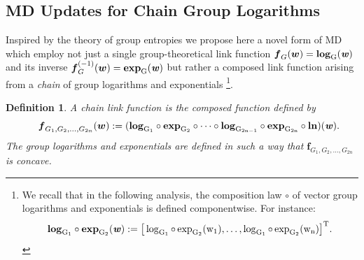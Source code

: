 \documentclass[10pt]{amsart}
\newcommand{\beq}{\begin{equation}}
\newcommand{\eeq}{\end{equation}}
\newcommand{\bi}[1]{\textbf{\textit{#1}}}
\newcommand{\bln}{\rm{\bf{ln}}}
\newcommand{\bexp}{\rm{\bf{exp}}}
\newcommand{\blog}{\rm{\bf{log}}}
\newcommand{\bof}{\boldsymbol{f}}
\newcommand{\bw}{\boldsymbol{w}}
\newtheorem{definition}{Definition}
\theoremstyle{definition}
\theoremstyle{definition}	 %
\begin{document}
\subsection {MD Updates for Chain Group Logarithms }



Inspired by the theory of group entropies we propose here a novel form of MD which employ not just a single group-theoretical link function $\bof_{G}(\bw)=\blog_{G}(\bi w)$ and its inverse $\bof_{G}^{(-1)}(\bw) =\bexp_G(\bi w)$ but rather a composed link function arising from a \textit{chain} of group logarithms and exponentials \footnote{We recall that in the following analysis, the composition law $\circ$ of vector group logarithms and exponentials is defined componentwise. For instance:
\beq
\blog_{G_1}\circ \bexp_{G_2}(\bi w):= \big[\log_{G_1}\circ\exp_{G_2}(w_1),\ldots, \log_{G_1}\circ\exp_{G_2}(w_n)\big]^{T}.
\eeq}.


%

\begin{definition}
A chain link function is the composed function defined by
\beq \hspace{5mm}
\bof_{G_1,G_2,\ldots,G_{2n}}(\bw) := (\rm{\bf{log}}_{G_1} \circ \bexp_{G_2}   \circ \cdots \circ \blog_{G_{2n-1}} \circ \bexp_{G_{2n}}  \circ \bln) (\bi w).
\eeq
The group logarithms and exponentials are defined in such a way that $\bof_{G_1,G_2,\ldots,G_{2n}}$ is concave.
\end{definition}
\end{document}
